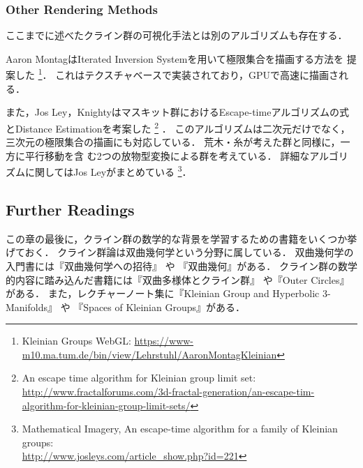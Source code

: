 \subsubsection{Other Rendering Methods}

ここまでに述べたクライン群の可視化手法とは別のアルゴリズムも存在する．

Aaron MontagはIterated Inversion Systemを用いて極限集合を描画する方法を
提案した\cite{Montag2014hyperbolicIFS}
\footnote{Kleinian Groups WebGL:
 \url{https://www-m10.ma.tum.de/bin/view/Lehrstuhl/AaronMontagKleinian}}．
これはテクスチャベースで実装されており，GPUで高速に描画される．

また，Jos Ley，Knightyはマスキット群におけるEscape-timeアルゴリズムの式
とDistance Estimationを考案した
\footnote{An escape time algorithm for Kleinian group limit set:\\ \quad
\quad
\url{http://www.fractalforums.com/3d-fractal-generation/an-escape-tim-algorithm-for-kleinian-group-limit-sets/}}
．
このアルゴリズムは二次元だけでなく，三次元の極限集合の描画にも対応している．
荒木・糸\cite{araki2008extension}が考えた群と同様に，一方に平行移動を含
む2つの放物型変換による群を考えている．
詳細なアルゴリズムに関してはJos Leyがまとめている
\footnote{Mathematical Imagery, An escape-time algorithm for a family of
Kleinian groups:\\ \quad \quad \url{http://www.josleys.com/article_show.php?id=221}}．

\subsection{Further Readings}

この章の最後に，クライン群の数学的な背景を学習するための書籍をいくつか挙げておく．
クライン群論は双曲幾何学という分野に属している．
双曲幾何学の入門書には『双曲幾何学への招待』
\cite{taniguchi_okumura199610invitation}や
『双曲幾何』\cite{mitani200409hyperbolicGeometry}がある．
クライン群の数学的内容に踏み込んだ書籍には『双曲多様体とクライン群』
\cite{taniguchi_matsuzaki_hyperbolicManifold}や『Outer Circles』
\cite{Marden200705outerCircles}がある．
また，レクチャーノート集に『Kleinian Group and Hyperbolic 3-Manifolds』
\cite{Y._V._C.200311}や
『Spaces of Kleinian Groups』\cite{Yair_Makoto_Caroline200606}がある．

\clearpage